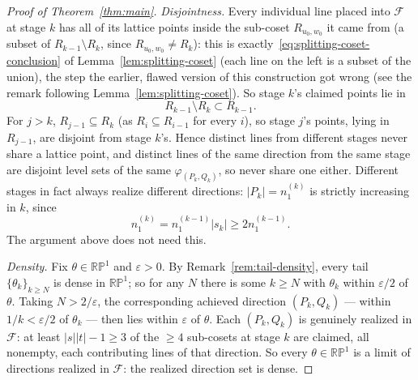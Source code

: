 \documentclass[a4paper,11pt,oneside,reqno]{amsart}
\theoremstyle{definition}
\theoremstyle{remark}
\theoremstyle{plain}
\newcommand{\RP}{\mathbb{RP}^1}
\begin{document}
\begin{proof}[Proof of Theorem~\ref{thm:main}]
  \emph{Disjointness.} Every individual line placed into \(\mathcal F\) at stage \(k\) has all of its
  lattice points inside the sub-coset \(R_{u_0,w_0}\) it came from (a subset of \(R_{k-1}\setminus
  R_k\), since \(R_{u_0,w_0}\ne R_k\)): this is exactly~\eqref{eq:splitting-coset-conclusion} of
  Lemma~\ref{lem:splitting-coset} (each line on the left is a subset of the union), the step the
  earlier, flawed version of this construction got wrong (see the remark following
  Lemma~\ref{lem:splitting-coset}). So stage \(k\)'s claimed points lie in
  \[R_{k-1}\setminus  R_k\subset R_{k-1}.\]
  For \(j>k\), \(R_{j-1}\subseteq R_k\) (as \(R_i\subseteq R_{i-1}\) for every \(i\)),
  so stage \(j\)'s points, lying in \(R_{j-1}\), are disjoint from stage \(k\)'s. Hence distinct lines
  from different stages never share a lattice point, and distinct lines of the same direction from
  the same stage are disjoint level sets of the same \(\varphi_{(P_k,Q_k)}\), so never share one
  either.
  Different stages in fact always realize different directions: \(|P_k|=n_1^{(k)}\) is
  strictly increasing in \(k\), since
  \[n_1^{(k)}=n_1^{(k-1)}|s_k|\ge2n_1^{(k-1)}.\]
  The argument above does not need this.

  \emph{Density.} Fix \(\theta\in\RP\) and \(\varepsilon>0\). By Remark~\ref{rem:tail-density}, every
  tail \(\{\theta_k\}_{k\ge N}\) is dense in \(\RP\); so for any \(N\) there is some \(k\ge N\) with
  \(\theta_k\) within \(\varepsilon/2\) of \(\theta\). Taking
  \(N>2/\varepsilon\), the corresponding achieved direction \((P_k,Q_k)\) --- within \(1/k<\varepsilon/2\)
  of \(\theta_k\) --- then lies within \(\varepsilon\) of \(\theta\). Each \((P_k,Q_k)\) is genuinely
  realized in \(\mathcal F\): at least \(|s||t|-1\ge3\) of the \(\ge4\) sub-cosets at stage \(k\) are
  claimed, all nonempty, each contributing lines of that direction. So every \(\theta\in\RP\) is a
  limit of directions realized in \(\mathcal F\): the realized direction set is dense.

\end{proof}
\end{document}
